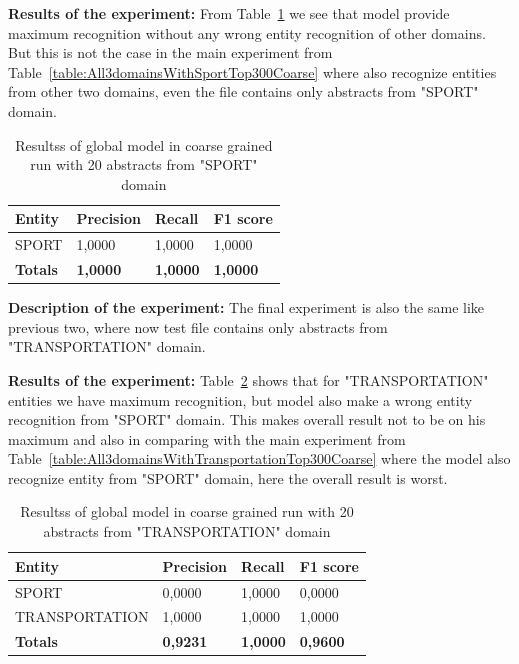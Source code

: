 \documentclass[thesis=M,english]{FITthesis}[2018/05/30]
\begin{document}
\textbf{Results of the experiment:} From Table~\ref{table:GlobalDomainWithSportTop20Coarse} we see that model provide maximum recognition without any wrong entity recognition of other domains. But this is not the case in the main experiment from Table~\ref{table:All3domainsWithSportTop300Coarse} where also recognize entities from other two domains, even the file contains only abstracts from "SPORT" domain. 

	\begin{table}[H]\centering
		\begin{tabular}{|l|l|l|l|}
			\hline {\textbf{Entity}} & {\textbf{Precision}} & {\textbf{Recall}} & {\textbf{F1 score}}\\\hline
				SPORT & 1,0000 & 1,0000 & 1,0000\\\hline
				\textbf{Totals} & \textbf{1,0000} & \textbf{1,0000} & \textbf{1,0000}\\\hline
		\end{tabular}
		\caption{Resultss of global model in coarse grained run with 20 abstracts from "SPORT" domain \label{table:GlobalDomainWithSportTop20Coarse}}
	\end{table}	

\textbf{Description of the experiment:} The final experiment is also the same like previous two, where now test file contains only abstracts from "TRANSPORTATION" domain.

\textbf{Results of the experiment:} Table~\ref{table:GlobalDomainWithTransportationTop20Coarse} shows that for "TRANSPORTATION" entities we have maximum recognition, but model also make a wrong entity recognition from "SPORT" domain. This makes overall result not to be on his maximum and also in comparing with the main experiment from Table~\ref{table:All3domainsWithTransportationTop300Coarse} where the model also recognize entity from "SPORT" domain, here the overall result is worst. 

	\begin{table}[H]\centering
		\begin{tabular}{|l|l|l|l|}
			\hline {\textbf{Entity}} & {\textbf{Precision}} & {\textbf{Recall}} & {\textbf{F1 score}}\\\hline
				SPORT & 0,0000 & 1,0000 & 0,0000\\
				TRANSPORTATION & 1,0000 & 1,0000 & 1,0000\\\hline
				\textbf{Totals} & \textbf{0,9231} & \textbf{1,0000} & \textbf{0,9600}\\\hline
		\end{tabular}
		\caption{Resultss of global model in coarse grained run with 20 abstracts from "TRANSPORTATION" domain \label{table:GlobalDomainWithTransportationTop20Coarse}}
	\end{table}	
\end{document}
